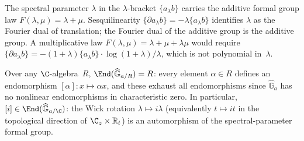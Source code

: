 \begin{observation}
\label{obs:sesquilinearity-additive}
\ClaimStatusProvedHere
{}
The spectral parameter $\lambda$ in the $\lambda$-bracket
$\{a_\lambda b\}$ carries the additive formal group law
$F(\lambda,\mu) = \lambda + \mu$. Sesquilinearity
$\{\partial a_\lambda b\} = -\lambda\{a_\lambda b\}$
identifies $\lambda$ as the Fourier dual of translation;
the Fourier dual of the additive group is the additive group.
A multiplicative law $F(\lambda,\mu) = \lambda + \mu + \lambda\mu$
would require
$\{\partial a_\lambda b\} = -(1+\lambda)\{a_\lambda b\} \cdot
\log(1+\lambda)/\lambda$,
which is not polynomial in~$\lambda$.
\end{observation}

\begin{observation}
\label{obs:end-additive}
\ClaimStatusProvedHere
{}
Over any $\C$-algebra~$R$,
$\End(\widehat{\mathbb{G}}_{a/R}) = R$:
every element $\alpha \in R$ defines an endomorphism
$[\alpha]\colon x \mapsto \alpha x$, and these exhaust all
endomorphisms since $\widehat{\mathbb{G}}_a$ has no nonlinear
endomorphisms in characteristic zero.
In particular, $[i] \in \End(\widehat{\mathbb{G}}_{a/\C})$:
the Wick rotation $\lambda \mapsto i\lambda$
(equivalently $t \mapsto it$ in the topological direction of
$\C_z \times \mathbb{R}_t$) is an automorphism of the
spectral-parameter formal group.
\end{observation}

